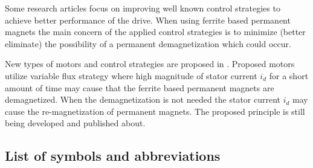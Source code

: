 \documentclass[a4paper, twoside, 11pt]{article}
\begin{document}
    Some research articles focus on improving well known control strategies to achieve better performance of the drive. When using ferrite based permanent magnets the main concern of the applied control strategies is to minimize (better eliminate) the possibility of a permanent demagnetization which could occur.\par
    New types of motors and control strategies are proposed in \cite{ostovic-Memory-motors-a-new-class-of-controllable-flux-PM-machines-for-a-true-wide-speed-operation}. Proposed motors utilize variable flux strategy where high magnitude of stator current $i_d$ for a short amount of time may cause that the ferrite based permanent magnets are demagnetized. When the demagnetization is not needed the stator current $i_d$ may cause the re-magnetization of permanent magnets. The proposed principle is still being developed and published about.


\flushbottom %


\newpage
\setmonofont{Times New Roman}

\printbibliography[title={{References}}]	
\nocite{*}
\setmonofont{CourierPrime-Regular}

\appendix
{}

\begin{appendices}
	\section{List of symbols and abbreviations}
    \vspace*{0.25cm}
		\printglossary[type=abbreviationslist, style = myStyleAbbreviations]

		\FloatBarrier
		\printglossary[type=symbolslist, style =  myStyleSymbols]

	\end{appendices}
\end{document}

